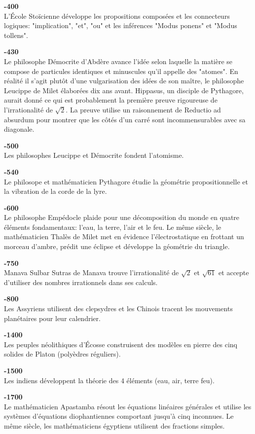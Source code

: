 \textbf{-400}\\
L'École Stoïcienne développe les propositions composées et les connecteurs logiques: "implication", "et", "ou" et les inférences "Modus ponens" et "Modus tollens".

\textbf{-430}\\
Le philosophe Démocrite d'Abdère avance l'idée selon laquelle la matière se compose de particules identiques et minuscules qu'il appelle des "atomes". En réalité il s'agit plutôt d'une vulgarisation des idées de son maître, le philosophe Leucippe de Milet élaborées dix ans avant. Hippasus, un disciple de Pythagore, aurait donné ce qui est probablement la première preuve rigoureuse de l'irrationalité de $\sqrt{2}$. La preuve utilise un raisonnement de Reductio ad absurdum pour montrer que les côtés d'un carré sont incommensurables avec sa diagonale.

\textbf{-500}\\
Les philosophes Leucippe et Démocrite fondent l'atomisme.

\textbf{-540}\\
Le philosope et mathématicien Pythagore étudie la géométrie propositionnelle et la vibration de la corde de la lyre.

\textbf{-600}\\
Le philosophe Empédocle plaide pour une décomposition du monde en quatre éléments fondamentaux: l'eau, la terre, l'air et le feu. Le même siècle, le mathématicien Thalès de Milet met en évidence l'électrostatique en frottant un morceau d'ambre, prédit une éclipse et développe la géométrie du triangle.

\textbf{-750}\\
Manava Sulbar Sutras de Manava trouve l'irrationalité de $\sqrt{2}$ et $\sqrt{61}$ et accepte d'utiliser des nombres irrationnels dans ses calculs.

\textbf{-800}\\
Les Assyriens utilisent des clepsydres et les Chinois tracent les mouvements planétaires pour leur calendrier.

\textbf{-1400}\\
Les peuples néolithiques d'Écosse construisent des modèles en pierre des cinq solides de Platon (polyèdres réguliers).

\textbf{-1500}\\
Les indiens développent la théorie des 4 éléments (eau, air, terre feu).

\textbf{-1700}\\
Le mathématicien Apastamba résout les équations linéaires générales et utilise les systèmes d'équations diophantiennes comportant jusqu'à cinq inconnues. Le même siècle, les mathématiciens égyptiens utilisent des fractions simples.


